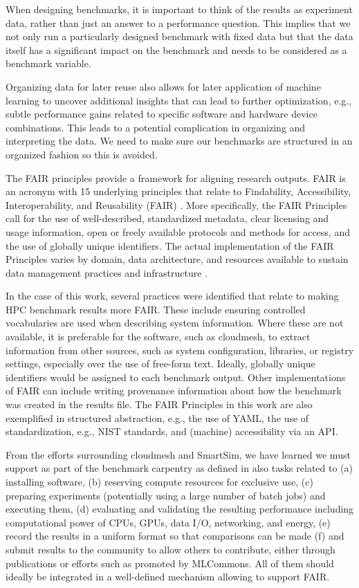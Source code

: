\documentclass[utf8]{FrontiersinVancouver} %
\begin{document}
When designing benchmarks, it is important to think of the results as experiment data, rather than just an answer to a performance question. 
This implies that we not only run a particularly designed benchmark with fixed data but that the data itself has a significant impact on the benchmark and needs to be considered as a benchmark variable.

Organizing data for later reuse also allows for later application of machine learning to uncover additional insights that can lead to further optimization, e.g., subtle performance gains related to specific software and hardware device combinations. 
This leads to a potential complication in organizing and interpreting the data. We need to make sure our benchmarks are structured in an organized fashion so this is avoided.

The FAIR principles provide a framework for aligning research outputs. FAIR is an acronym with 15 underlying principles that relate to Findability, Accessibility, Interoperability, and Reusability (FAIR) \citep{wilkinson2016fair}. More specifically, the FAIR Principles call for the use of well-described, standardized metadata, clear licensing and usage information, open or freely available protocols and methods for access, and the use of globally unique identifiers. The actual implementation of the FAIR Principles varies by domain, data architecture, and resources available to sustain data management practices and infrastructure \citep{jacobsen2020fair}.

In the case of this work, several practices were identified that relate to making HPC benchmark results more FAIR\citep{kirkpatrick2024}. These include ensuring controlled vocabularies are used when describing system information. Where these are not available, it is preferable for the software, such as cloudmesh, to extract information from other sources, such as system configuration, libraries, or registry settings, especially over the use of free-form text. Ideally, globally unique identifiers would be assigned to each benchmark output. Other implementations of FAIR can include writing provenance information about how the benchmark was created in the results file. The FAIR Principles in this work are also exemplified in structured abstraction, e.g., the use of YAML, the use of standardization, e.g., NIST standards, and (machine) accessibility via an API. 

From the efforts surrounding cloudmesh and SmartSim, we have learned we must support as part of the benchmark carpentry as defined in \citep{las-frontiers-edu} also tasks related to  (a) installing software, (b) reserving compute resources for exclusive use, (c) preparing experiments (potentially using a large number of batch jobs) and executing them, (d) evaluating and validating the resulting performance including computational power of CPUs, GPUs, data I/O, networking, and energy, (e) record the results in a uniform format so that comparisons can be made (f) and submit results to the community to allow others to contribute, either through publications or efforts such as promoted by MLCommons. All of them should ideally be integrated in a well-defined mechanism allowing to support FAIR.
\end{document}
